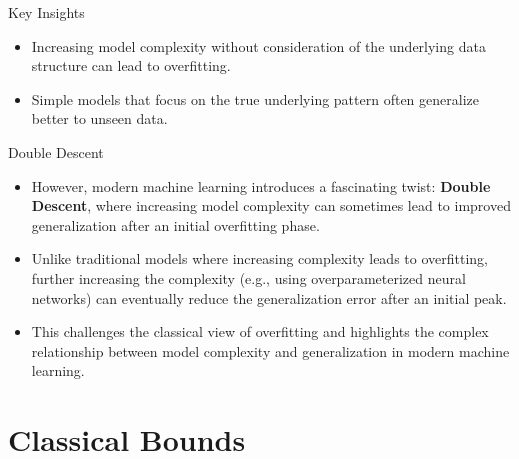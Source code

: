 \documentclass[
  ignorenonframetext,
]{beamer}
\providecommand{\tightlist}{%
  \setlength{\itemsep}{0pt}\setlength{\parskip}{0pt}}\usepackage{longtable,booktabs,array}
\begin{document}
\begin{frame}
\begin{block}{Key Insights}
\label{key-insights}
\begin{itemize}
\tightlist
\item
  Increasing model complexity without consideration of the underlying
  data structure can lead to overfitting.
\item
  Simple models that focus on the true underlying pattern often
  generalize better to unseen data.
\end{itemize}
\end{block}
\end{frame}

\begin{frame}{Double Descent}
\label{double-descent}
\begin{itemize}
\tightlist
\item
  However, modern machine learning introduces a fascinating twist:
  \textbf{Double Descent}, where increasing model complexity can
  sometimes lead to improved generalization after an initial overfitting
  phase.
\item
  Unlike traditional models where increasing complexity leads to
  overfitting, further increasing the complexity (e.g., using
  overparameterized neural networks) can eventually reduce the
  generalization error after an initial peak.
\item
  This challenges the classical view of overfitting and highlights the
  complex relationship between model complexity and generalization in
  modern machine learning.
\end{itemize}
\end{frame}

\section{Classical Bounds}\label{classical-bounds}
\end{document}
